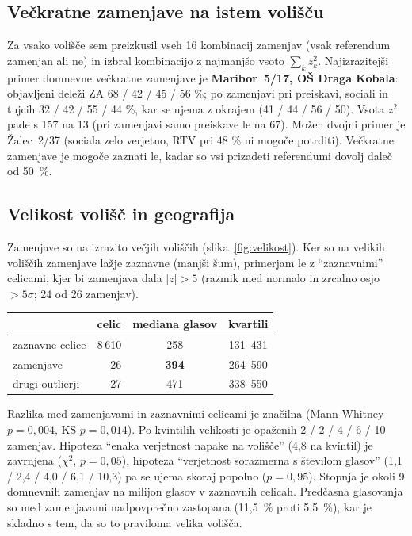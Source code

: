 \documentclass[11pt,a4paper]{article}
\begin{document}
\subsection{Večkratne zamenjave na istem volišču}\label{sec:veckratne}

Za vsako volišče sem preizkusil vseh 16 kombinacij zamenjav (vsak referendum zamenjan ali ne) in izbral kombinacijo z najmanjšo vsoto $\sum_k z_k^2$. Najizrazitejši primer domnevne večkratne zamenjave je \textbf{Maribor~5/17, OŠ Draga Kobala}: objavljeni deleži ZA 68 / 42 / 45 / 56 \%; po zamenjavi pri preiskavi, sociali in tujcih 32 / 42 / 55 / 44 \%, kar se ujema z okrajem (41 / 44 / 56 / 50). Vsota $z^2$ pade s 157 na 13 (pri zamenjavi samo preiskave le na 67). Možen dvojni primer je Žalec~2/37 (sociala zelo verjetno, RTV pri 48 \% ni mogoče potrditi). Večkratne zamenjave je mogoče zaznati le, kadar so vsi prizadeti referendumi dovolj daleč od 50~\%.

\subsection{Velikost volišč in geografija}
\label{sec:velikost}

Zamenjave so na izrazito večjih voliščih (slika~\ref{fig:velikost}). Ker so na velikih voliščih zamenjave lažje zaznavne (manjši šum), primerjam le z ``zaznavnimi'' celicami, kjer bi zamenjava dala $|z|>5$ (razmik med normalo in zrcalno osjo $>5\sigma$; 24 od 26 zamenjav).

\begin{center}
\begin{tabular}{lrcc}
\toprule
 & celic & mediana glasov & kvartili \\
\midrule
zaznavne celice & 8\,610 & 258 & 131--431 \\
zamenjave & 26 & \textbf{394} & 264--590 \\
drugi outlierji & 27 & 471 & 338--550 \\
\bottomrule
\end{tabular}
\end{center}

Razlika med zamenjavami in zaznavnimi celicami je značilna (Mann-Whitney $p=0{,}004$, KS $p=0{,}014$). Po kvintilih velikosti je opaženih 2 / 2 / 4 / 6 / 10 zamenjav. Hipoteza ``enaka verjetnost napake na volišče'' (4,8 na kvintil) je zavrnjena ($\chi^2$, $p=0{,}05$), hipoteza ``verjetnost sorazmerna s številom glasov'' (1,1 / 2,4 / 4,0 / 6,1 / 10,3) pa se ujema skoraj popolno ($p=0{,}95$). Stopnja je okoli 9 domnevnih zamenjav na milijon glasov v zaznavnih celicah. Predčasna glasovanja so med zamenjavami nadpovprečno zastopana (11,5~\% proti 5,5~\%), kar je skladno s tem, da so to praviloma velika volišča.
\end{document}
